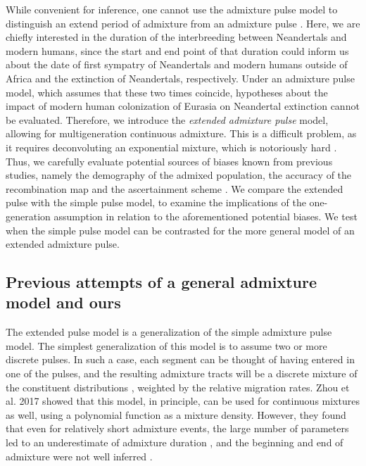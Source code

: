 \documentclass[]{article}
\begin{document}
While convenient for inference, one cannot use the admixture pulse model to distinguish an extend period of admixture from an admixture pulse \citep{pickrell_toward_2014}. Here, we are chiefly interested in the duration of the interbreeding between Neandertals and modern humans, since the start and end point of that duration could inform us about the date of first sympatry of Neandertals and modern humans outside of Africa and the extinction of Neandertals, respectively.  Under an admixture pulse model, which assumes that these two times coincide, hypotheses about the impact of modern human colonization of Eurasia on Neandertal extinction cannot be evaluated. Therefore, we introduce the \textit{extended admixture pulse} model, allowing for multigeneration continuous admixture. This is a difficult problem, as it requires deconvoluting an exponential mixture, which is notoriously hard \citep{dasgupta_mixture_2008}. Thus, we carefully evaluate potential sources of biases known from previous studies, namely the demography of the admixed population, the accuracy of the recombination map and the ascertainment scheme \citep{sankararaman_date_2012,fu_genome_2014,moorjani_genetic_2016}.
We compare the extended pulse with the simple pulse model, to examine the implications of the one-generation assumption in relation to the aforementioned potential biases. We test when the simple pulse model can be contrasted for the more general model of an extended admixture pulse.

\subsection{Previous attempts of a general admixture model and ours}\label{Previous attempts of a general admixture model and ours}

The extended pulse model is a generalization of the simple admixture pulse model. The simplest generalization of this model is to assume two or more discrete pulses. In such a case,  each segment can be thought of having entered in one of the pulses, and the resulting admixture tracts will be a discrete mixture of the constituent distributions \citep{pickrell_ancient_2014}, weighted by the relative migration rates. Zhou et al. 2017 \citep{zhou_modeling_2017} showed that this model, in principle, can be used for continuous mixtures as well, using a polynomial function as a mixture density. However, they found that even for relatively short admixture events, the large number of parameters led to an underestimate of admixture duration \citep{zhou_inference_2017}, and the beginning and end of admixture were not well inferred
\citep{zhou_modeling_2017,zhou_inference_2017}. 
\end{document}
